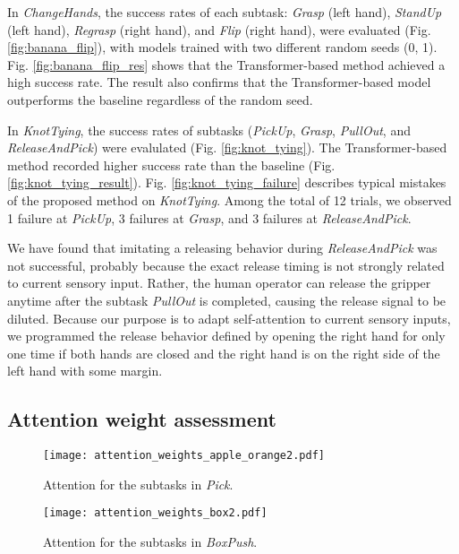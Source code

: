 \documentclass[letterpaper, 10 pt, conference]{ieeeconf}  %
\renewcommand\hl[1]{#1} %
\begin{document}
In \textit{ChangeHands}, the success rates of each subtask: \textit{Grasp} (left hand), \textit{StandUp} (left hand), \textit{Regrasp} (right hand), and \textit{Flip} (right hand), were evaluated (Fig. \ref{fig:banana_flip}), with models trained with two different random seeds (0, 1). Fig. \ref{fig:banana_flip_res} shows that the Transformer-based method achieved a high success rate. 
The result also confirms that the Transformer-based model outperforms the baseline regardless of the random seed.


In \textit{KnotTying}, the success rates of subtasks (\textit{PickUp}, \textit{Grasp}, \textit{PullOut}, and \textit{ReleaseAndPick}) were evalulated (Fig. \ref{fig:knot_tying}). The Transformer-based method recorded higher success rate than the baseline (Fig. \ref{fig:knot_tying_result}). \hl{Fig. }\ref{fig:knot_tying_failure} \hl{describes typical mistakes of the proposed method on \textit{KnotTying}. Among the total of 12 trials, we observed 1 failure at \textit{PickUp}, 3 failures at \textit{Grasp}, and 3 failures at \textit{ReleaseAndPick}.}

We have found that imitating a releasing behavior during \textit{ReleaseAndPick} was not successful, probably because the exact release timing is not strongly related to current sensory input. Rather, the human operator can release the gripper anytime after the subtask \textit{PullOut} is completed, causing the release signal to be diluted. Because our purpose is to adapt self-attention to current sensory inputs, we programmed the release behavior defined by opening the right hand for only one time if both hands are closed and the right hand is on the right side of the left hand with some margin.

\subsection{Attention weight assessment}
\begin{figure}
  \centering
  \texttt{[image: attention\_weights\_apple\_orange2.pdf]}
  \captionsetup{justification=centering}
  \caption{\hl{Attention} for the subtasks in \textit{Pick}.}
  \label{fig:apple_orange_attention_weights}
 \end{figure}

\begin{figure}
  \centering
  \texttt{[image: attention\_weights\_box2.pdf]}
  \captionsetup{justification=centering}
  \caption{\hl{Attention} for the subtasks in \textit{BoxPush}.}
  \label{fig:box_attention_weights}
 \end{figure}
\end{document}
